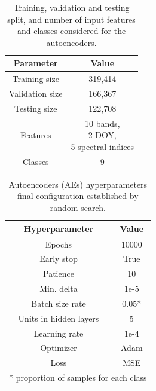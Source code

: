 \documentclass[journal,article,submit,pdftex,moreauthors]{Definitions/mdpi}
\begin{document}
\begin{minipage}[t]{0.45\textwidth}
	\begin{table}[H]
        \centering
        \footnotesize
		\caption{Training, validation and testing split, and number of input features and classes considered for the autoencoders.}
		\begin{tabular}{c|c} 
			\hline
			Parameter & Value \\ [1ex] 
			\hline
			Training size & 319,414 \\ [1ex]
			Validation size & 166,367 \\[1ex]
			Testing size & 122,708 \\ [1ex]
			Features & \makecell{10 bands, \\ 2 DOY,\\ 5 spectral indices} \\ [1ex] 
			Classes & 9 \\ [1ex] 
			\hline
		\end{tabular}
	\label{data_split}
	\end{table}
\end{minipage}\hspace{0.5cm}
\begin{minipage}[t]{0.45\textwidth}
	\begin{table}[H]
        \centering
        \footnotesize
		\caption{Autoencoders (AEs) hyperparameters final configuration established by random search.}
		\begin{tabular}{c|c}
		\hline
			Hyperparameter & Value \\ \hline
			Epochs & 10000 \\
			Early stop & True \\ 
			Patience & 10 \\ 
			Min. delta & 1e-5 \\ 
			Batch size rate & 0.05* \\ 
			Units in hidden layers & 5 \\ 
			Learning rate & 1e-4 \\ 
			Optimizer & Adam \\ 
			Loss & MSE \\ \hline
			\multicolumn{2}{c}{* proportion of samples for each class}
		\end{tabular}
		\label{hyperparameters_aes}
	\end{table}
\end{minipage}\vspace{0.5cm}

\end{document}
